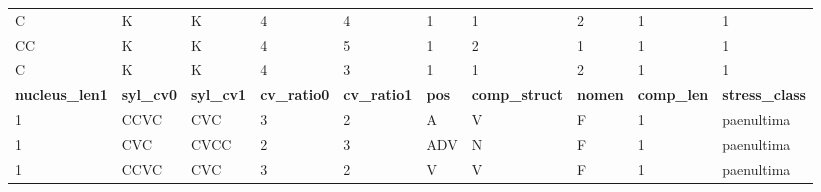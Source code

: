 \begin{table}[p]
\begin{tabular}{|p{2cm}|p{2cm}|p{2cm}|p{2cm}|p{2cm}|p{1.5cm}|p{1.5cm}|p{1.5cm}|p{1.8cm}|p{1.8cm}|}
C                       & K                       & K                       & 4                       & 4                       & 1                   & 1                   & 2                      & 1                      & 1                      \\
CC                      & K                       & K                       & 4                       & 5                       & 1                   & 2                   & 1                      & 1                      & 1                      \\
C                       & K                       & K                       & 4                       & 3                       & 1                   & 1                   & 2                      & 1                      & 1                      \\\hline
\hline
{\bf nucleus\_len1}     & {\bf syl\_cv0}          & {\bf syl\_cv1}          & {\bf cv\_ratio0}        & {\bf cv\_ratio1}        & {\bf pos}           & {\bf comp\_struct}  & {\bf nomen}            & {\bf comp\_len}        & {\bf stress\_class}    \\
1                       & CCVC                    & CVC                     & 3                       & 2                       & A                   & V                   & F                      & 1                      & paenultima             \\
1                       & CVC                     & CVCC                    & 2                       & 3                       & ADV                 & N                   & F                      & 1                      & paenultima             \\
1                       & CCVC                    & CVC                     & 3                       & 2                       & V                   & V                   & F                      & 1                      & paenultima            \\\hline
\end{tabular}
\end{table}